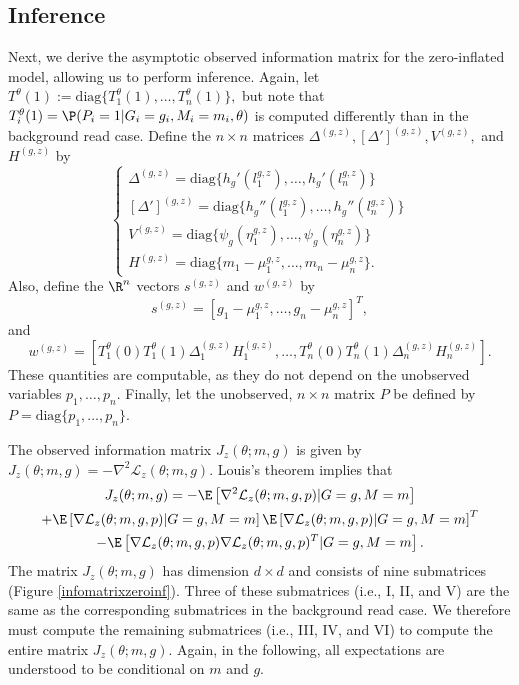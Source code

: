 \documentclass[11pt]{article}
\begin{document}
\begin{appendices}
\begin{refsection}
\subsection{Inference}
Next, we derive the asymptotic observed information matrix for the zero-inflated model, allowing us to perform inference. Again, let $T^{\theta}(1) := \textrm{diag}\{T^{\theta}_1(1), \dots, T^{\theta}_n(1)\},$ but note that $T^\theta_i(1) = \P(P_i = 1 | G_i = g_i, M_i = m_i, \theta)$ is computed differently than in the background read case. Define the $n \times n$ matrices $\Delta^{(g,z)}, [\Delta']^{(g,z)}, V^{(g,z)},$ and $H^{(g,z)}$ by
$$
\begin{cases}
\Delta^{(g,z)} = \textrm{diag} \{ h_g'(l_1^{g,z} ), \dots, h_g'( l_n^{g,z}  ) \} \\
[\Delta']^{(g,z)}  = \textrm{diag} \{ h_g''(l_1^{g,z} ), \dots, h_g''( l_n^{g,z} ) \} \\
V^{(g,z)}  = \textrm{diag} \{ \psi_g( \eta^{g,z} _1), \dots, \psi_g( \eta^{g,z}_n) \} \\
H^{(g,z)}  = \textrm{diag} \{ m_1 - \mu_1^{g,z} , \dots, m_n - \mu_n^{g,z} \} .
\end{cases}
$$
Also, define the $\R^n$ vectors $s^{(g,z)}$ and $w^{(g,z)}$ by
$$s^{(g,z)} = [g_1 - \mu_1^{g,z}, \dots, g_n - \mu_n^{g,z}]^T,$$ and $$w^{(g,z)} = [T^\theta_1(0)T^\theta_1(1) \Delta_1^{(g,z)}H^{(g,z)}_1,\dots, T^\theta_n(0)T^\theta_n(1) \Delta_n^{(g,z)}H^{(g,z)}_n].$$ These quantities are computable, as they do not depend on the unobserved variables $p_1, \dots, p_n$. Finally, let the unobserved, $n\times n$ matrix $P$ be defined by $P = \textrm{diag}\{ p_1, \dots, p_n \}$.


The observed information matrix $J_z(\theta; m, g)$ is given by
$J_z(\theta; m, g) = -\nabla^2 \mathcal{L}_z(\theta; m, g).$ Louis's theorem implies that
\begin{multline*}
J_z(\theta; m, g) = -\E \left[\nabla^2 \mathcal{L}_z(\theta; m, g, p) | G = g, M = m \right] \\ + \E\left[\nabla \mathcal{L}_z(\theta; m, g, p) | G = g, M = m \right] \E\left[\nabla \mathcal{L}_z(\theta; m, g, p) | G = g, M = m \right]^T \\ - \E\left[\nabla\mathcal{L}_z(\theta; m, g, p) \nabla \mathcal{L}_z(\theta; m, g, p)^T | G = g, M = m \right].
\end{multline*}
The matrix $J_z(\theta; m, g)$ has dimension $d \times d$ and consists of nine submatrices (Figure \ref{infomatrixzeroinf}). Three of these submatrices (i.e., I, II, and V) are the same as the corresponding submatrices in the background read case. We therefore must compute the remaining submatrices (i.e., III, IV, and VI) to compute the entire matrix $J_z(\theta; m, g)$. Again, in the following, all expectations are understood to be conditional on $m$ and $g$.


\end{refsection}
\end{appendices}
\end{document}
